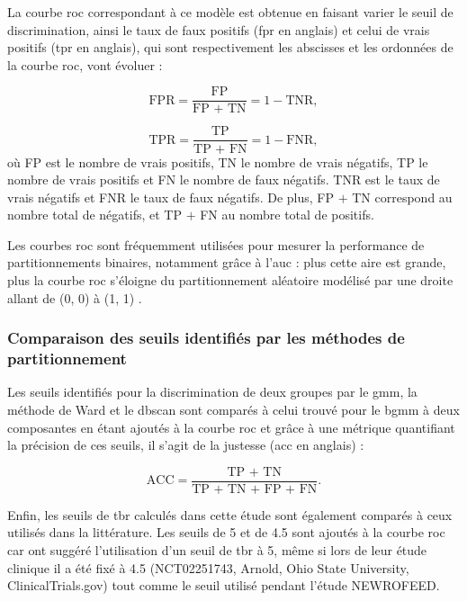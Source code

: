 La courbe \gls{roc} correspondant à ce modèle est obtenue en faisant varier le seuil de discrimination, ainsi le taux de faux positifs (\gls{fpr} en anglais) 
et celui de vrais positifs (\gls{tpr} en anglais), qui sont respectivement les abscisses et les ordonnées de la courbe \gls{roc}, 
vont évoluer \citep[Chapitre~4]{James2013} : 

\begin{equation}
\label{eq:tbr_fpr_tpr}
\text{FPR} = \frac{\text{FP}}{\text{FP + TN}} = 1 - \text{TNR},
\end{equation}

\begin{equation}
\label{eq:tbr_tpr}
\text{TPR} = \frac{\text{TP}}{\text{TP + FN}} = 1 - \text{FNR},
\end{equation}
où FP est le nombre de vrais positifs, TN le nombre de vrais négatifs, TP le nombre de vrais positifs et FN le nombre de faux négatifs. 
TNR est le taux de vrais négatifs et FNR le taux de faux négatifs.
De plus, FP $+$ TN correspond au nombre total de négatifs, et TP $+$ FN au nombre total de positifs.

Les courbes \gls{roc} sont fréquemment utilisées pour mesurer la performance de partitionnements binaires, notamment grâce à
l'\gls{auc} : plus cette aire est grande, plus la courbe \gls{roc} s'éloigne du partitionnement aléatoire modélisé par une droite allant
de (0, 0) à (1, 1) \citep[Chapitre~3]{James2013}. 

\subsubsection{Comparaison des seuils identifiés par les méthodes de partitionnement}
Les seuils identifiés pour la discrimination de deux groupes par le \gls{gmm}, la méthode de Ward et le \gls{dbscan} sont comparés à celui trouvé pour 
le \gls{bgmm} à deux composantes en étant ajoutés à la courbe \gls{roc} et grâce à une métrique quantifiant la précision de ces seuils, 
il s'agit de la justesse (\gls{acc} en anglais) :

\begin{equation}
\label{eq:tbr_accuracy}
\text{ACC} = \frac{\text{TP + TN}}{\text{TP + TN + FP + FN}}.
\end{equation}

Enfin, les seuils de \gls{tbr} calculés dans cette étude sont également comparés à ceux utilisés dans la littérature. Les seuils de 5 et de 4.5 sont
ajoutés à la courbe \gls{roc} car \citet{Kerson2013} ont suggéré l'utilisation d'un seuil de \gls{tbr} à 5, même si lors de leur étude clinique il a été fixé 
à 4.5 (NCT02251743, Arnold, Ohio State University, ClinicalTrials.gov) tout comme le seuil utilisé pendant l'étude NEWROFEED. 

